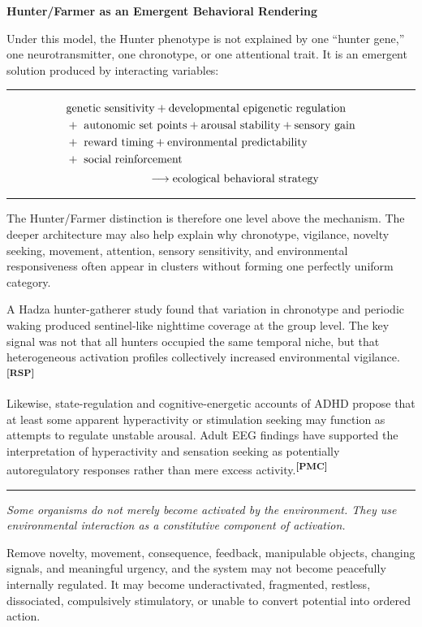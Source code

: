 \documentclass[10pt]{article}
\newcommand{\ActiveAccent}{Industrial}
\newcommand{\papersection}[2]{%
  \Needspace{8\baselineskip}
  \vspace{1.1em}
  \noindent\begin{minipage}[t]{0.12\textwidth}
    \vspace{1pt}{\sffamily\bfseries\fontsize{17}{17}\selectfont\textcolor{\ActiveAccent}{#1}}
  \end{minipage}%
  \begin{minipage}[t]{0.86\textwidth}
    {\sffamily\bfseries\fontsize{16.2}{19}\selectfont #2}\par
    \vspace{0.35em}{\color{\ActiveAccent}\rule{\linewidth}{1.15pt}}
  \end{minipage}
  \vspace{0.55em}
}
\newcommand{\sourcecue}[1]{\textsuperscript{\sffamily\bfseries\fontsize{6.5}{7}\selectfont\textcolor{\ActiveAccent}{[#1]}}}
\newcommand{\pullquote}[1]{%
  \begin{center}\vspace{0.45em}
  \begin{minipage}{0.88\linewidth}
  {\color{\ActiveAccent}\rule{0.28in}{2.2pt}}\par\vspace{0.45em}
  {\fontsize{13.5}{18}\selectfont\itshape #1}\par
  \vspace{0.5em}{\color{\ActiveAccent}\rule{0.28in}{2.2pt}}
  \end{minipage}\vspace{0.45em}\end{center}
}
\newenvironment{equationpanel}{\begin{center}\begin{minipage}{0.92\linewidth}\color{\ActiveAccent}\rule{\linewidth}{0.55pt}\par\vspace{-0.25em}\color{Ink}}{\vspace{-0.10em}\par\color{\ActiveAccent}\rule{\linewidth}{0.55pt}\end{minipage}\end{center}}
\begin{document}
\papersection{II}{Hunter/Farmer as an Emergent Behavioral Rendering}

Under this model, the Hunter phenotype is not explained by one ``hunter gene,'' one neurotransmitter, one chronotype, or one attentional trait. It is an emergent solution produced by interacting variables:

\begin{equationpanel}
\begin{align*}
&\text{genetic sensitivity} + \text{developmental epigenetic regulation}\\
&+\ \text{autonomic set points} + \text{arousal stability} + \text{sensory gain}\\
&+\ \text{reward timing} + \text{environmental predictability}\\
&+\ \text{social reinforcement}\\[2pt]
&\hspace{1.0in}\longrightarrow \text{ecological behavioral strategy}
\end{align*}
\end{equationpanel}

The Hunter/Farmer distinction is therefore one level above the mechanism. The deeper architecture may also help explain why chronotype, vigilance, novelty seeking, movement, attention, sensory sensitivity, and environmental responsiveness often appear in clusters without forming one perfectly uniform category.

A Hadza hunter-gatherer study found that variation in chronotype and periodic waking produced sentinel-like nighttime coverage at the group level. The key signal was not that all hunters occupied the same temporal niche, but that heterogeneous activation profiles collectively increased environmental vigilance.\sourcecue{RSP}

Likewise, state-regulation and cognitive-energetic accounts of ADHD propose that at least some apparent hyperactivity or stimulation seeking may function as attempts to regulate unstable arousal. Adult EEG findings have supported the interpretation of hyperactivity and sensation seeking as potentially autoregulatory responses rather than mere excess activity.\sourcecue{PMC}

\pullquote{Some organisms do not merely become activated by the environment. They use environmental interaction as a constitutive component of activation.}

Remove novelty, movement, consequence, feedback, manipulable objects, changing signals, and meaningful urgency, and the system may not become peacefully internally regulated. It may become underactivated, fragmented, restless, dissociated, compulsively stimulatory, or unable to convert potential into ordered action.
\end{document}
